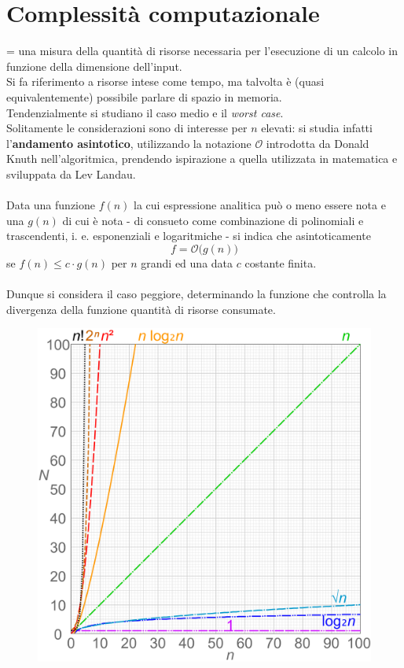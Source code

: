 \documentclass[10pt, oneside]{book}
\begin{document}
\section{Complessità computazionale}
= una misura della quantità di risorse necessaria per l'esecuzione di un calcolo in funzione della dimensione dell'input.\\
Si fa riferimento a risorse intese come tempo, ma talvolta è (quasi equivalentemente) possibile parlare di spazio in memoria.\\
Tendenzialmente si studiano il caso medio e il \textit{worst case}.\\
Solitamente le considerazioni sono di interesse per $n$ elevati: si studia infatti l'\textbf{andamento asintotico}, utilizzando la notazione $\mathcal{O}$ introdotta da Donald Knuth nell'algoritmica, prendendo ispirazione a quella utilizzata in matematica e sviluppata da Lev Landau.\\~\\
Data una funzione $f(n)$ la cui espressione analitica può o meno essere nota e una $g(n)$ di cui è nota - di consueto come combinazione di polinomiali e trascendenti, i. e. esponenziali e logaritmiche - si indica che asintoticamente 
\[f = \mathcal{O}\big(g(n)\big)\]
se $f(n) \leq c \cdot g(n)$ per $n$ grandi ed una data $c$ costante finita.\\~\\
Dunque si considera il caso peggiore, determinando la funzione che controlla la divergenza della funzione quantità di risorse consumate.

\begin{figure}[h!]
\centering
\includegraphics[scale=0.09]{complexity.png}
\end{figure}
\end{document}
